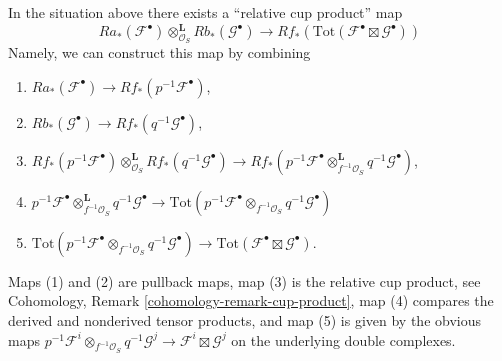 \medskip\noindent
In the situation above there exists a ``relative cup product'' map
\begin{equation}
\label{equation-relative-de-rham-kunneth}
Ra_*(\mathcal{F}^\bullet)
\otimes_{\mathcal{O}_S}^\mathbf{L}
Rb_*(\mathcal{G}^\bullet)
\longrightarrow
Rf_*\left(\text{Tot}(\mathcal{F}^\bullet \boxtimes \mathcal{G}^\bullet)\right)
\end{equation}
Namely, we can construct this map by combining
\begin{enumerate}
\item $Ra_*(\mathcal{F}^\bullet) \to Rf_*(p^{-1}\mathcal{F}^\bullet)$,
\item $Rb_*(\mathcal{G}^\bullet) \to Rf_*(q^{-1}\mathcal{G}^\bullet)$,
\item
$Rf_*(p^{-1}\mathcal{F}^\bullet)
\otimes_{\mathcal{O}_S}^\mathbf{L}
Rf_*(q^{-1}\mathcal{G}^\bullet)
\to
Rf_*(p^{-1}\mathcal{F}^\bullet \otimes_{f^{-1}\mathcal{O}_S}^\mathbf{L}
q^{-1}\mathcal{G}^\bullet)$,
\item
$p^{-1}\mathcal{F}^\bullet \otimes_{f^{-1}\mathcal{O}_S}^\mathbf{L}
q^{-1}\mathcal{G}^\bullet \to
\text{Tot}(p^{-1}\mathcal{F}^\bullet \otimes_{f^{-1}\mathcal{O}_S}
q^{-1}\mathcal{G}^\bullet)$
\item
$\text{Tot}(p^{-1}\mathcal{F}^\bullet \otimes_{f^{-1}\mathcal{O}_S}
q^{-1}\mathcal{G}^\bullet) \to \text{Tot}(\mathcal{F}^\bullet \boxtimes
\mathcal{G}^\bullet)$.
\end{enumerate}
Maps (1) and (2) are pullback maps, map (3) is
the relative cup product, see
Cohomology, Remark \ref{cohomology-remark-cup-product},
map (4) compares the derived and nonderived tensor products, and
map (5) is given by the obvious maps
$p^{-1}\mathcal{F}^i \otimes_{f^{-1}\mathcal{O}_S} q^{-1}\mathcal{G}^j
\to \mathcal{F}^i \boxtimes \mathcal{G}^j$ on the underlying double complexes.

